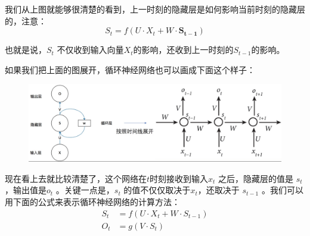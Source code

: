 \documentclass[12pt]{article}
\begin{document}
我们从上图就能够很清楚的看到，上一时刻的隐藏层是如何影响当前时刻的隐藏层的，注意：
$$
S_t = f(U\cdot X_t + W \cdot \mathbf{S_{t-1}})
$$

也就是说，$S_t$ 不仅收到输入向量$X_t$的影响，还收到上一时刻的$S_{t-1}$的影响。

如果我们把上面的图展开，循环神经网络也可以画成下面这个样子：
\begin{figure}[H]
    \centering
    \includegraphics[width=1\textwidth]{fig/RNN_Structure_Expand_By_Time.png}
\end{figure}

现在看上去就比较清楚了，这个网络在$t$时刻接收到输入$x_t$ 之后，隐藏层的值是 $s_t$ ，输出值是$o_t$ 。关键一点是，$s_t$ 的值不仅仅取决于$x_t$，还取决于 $s_{t-1}$ 。我们可以用下面的公式来表示循环神经网络的计算方法：
\begin{align*}
S_t &= f(U\cdot X_t + W \cdot S_{t-1}) \\
O_t &= g(V \cdot S_t) \\
\end{align*}
\end{document}
